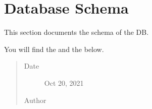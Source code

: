 \documentclass[letterpaper,10pt,english]{sphinxmanual}
\begin{document}
\chapter{Database Schema}
\label{\detokenize{schema_tables:database-schema}}\label{\detokenize{schema_tables:coding-procedure}}\label{\detokenize{schema_tables::doc}}
\begin{sphinxShadowBox}

\sphinxAtStartPar
This section documents the schema of the DB.

\sphinxAtStartPar
You will find the {\hyperref[\detokenize{schema_tables:schema-definitions}]{}} and the {\hyperref[\detokenize{schema_tables:reference-tables}]{}} below.
\begin{quote}\begin{description}
\item[{Date}] \leavevmode
\sphinxAtStartPar
Oct 20, 2021

\item[{Author}] \leavevmode
\sphinxAtStartPar
{}

\end{description}\end{quote}
\end{sphinxShadowBox}
\end{document}
